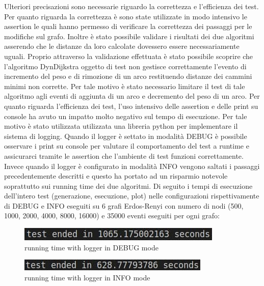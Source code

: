\documentclass[a4paper]{article}
\begin{document}
Ulteriori precisazioni sono necessarie riguardo la correttezza e l'efficienza dei test.
Per quanto riguarda la correttezza è sono state utilizzate in modo intensivo le assertion le quali hanno permesso di verificare la correttezza dei passaggi per le modifiche sul grafo. Inoltre è stato possibile validare i risultati dei due algoritmi asserendo che le distanze da loro calcolate dovessero essere necessariamente uguali. Proprio attraverso la validazione effettuata è stato possibile scoprire che l'algoritmo DynDijkstra oggetto di test non gestisce correttamente l'evento di incremento del peso e di rimozione di un arco restituendo distanze dei cammini minimi non corrette. Per tale motivo è stato necessario limitare il test di tale algoritmo agli eventi di aggiunta di un arco e decremento del peso di un arco. Per quanto riguarda l'efficienza dei test, l'uso intensivo delle assertion e delle print su console ha avuto un impatto molto negativo sul tempo di esecuzione. Per tale motivo è stato utilizzata utilizzata una libreria python per implementare il sistema di logging. Quando il logger è settato in modalità DEBUG è possibile osservare i print su console per valutare il comportamento del test a runtime e assicurarci tramite le assertion che l'ambiente di test funzioni correttamente. Invece quando il logger è configurato in modalità INFO vengono saltati i passaggi precedentemente descritti e questo ha portato ad un risparmio notevole soprattutto sui running time dei due algoritmi. Di seguito i tempi di esecuzione dell'intero test (generazione, esecuzione, plot) nelle configurazioni rispettivamente di DEBUG e INFO eseguiti su 6 grafi Erdos-Renyi con numero di nodi (500, 1000, 2000, 4000, 8000, 16000) e 35000 eventi eseguiti per ogni grafo:
\begin{figure}[!h]
\includegraphics[scale=1]{img/test_DEBUG_6g_500n_35Kevent_20KmissingEdge}
\centering
\caption{running time with logger in DEBUG mode}
\end{figure}
\begin{figure}[!h]
\includegraphics[scale=1]{img/test_INFO_6g_500n_35Kevent_20KmissingEdge}
\centering
\caption{running time with logger in INFO mode}
\end{figure}
\newpage
\end{document}
